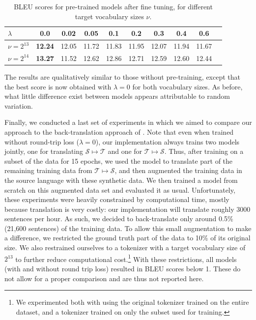 \documentclass[11pt,a4paper]{article}
\begin{document}
\begin{table} [ht]
\centering
\small
\begin{tabular}{ l || c | c | c | c | c | c | c | c | c  }
  $\lambda$ & 0.0 & 0.02 & 0.05 & 0.1 & 0.2 & 0.3 & 0.4 & 0.6 \\ \hline
  $\nu=2^{13}$ & \textbf{12.24} & 12.05 & 11.72 & 11.83 & 11.95 & 12.07 & 11.94 & 11.67 \\
  $\nu=2^{14}$ & \textbf{13.27} & 11.52 & 12.62 & 12.86 & 12.71 & 12.59 & 12.60 & 12.44 \\
\end{tabular}
\caption{BLEU scores for pre-trained models after fine tuning, for different target vocabulary sizes $\nu$.}
\label{tab:result2}
\end{table}

The results are qualitatively similar to those without pre-training, except that the best score is now obtained with $\lambda=0$ for both vocabulary sizes. As before, what little difference exist between models appears attributable to random variation.

Finally, we conducted a last set of experiments in which we aimed to compare our approach to the back-translation approach of \citet{backtrans}. Note that even when trained without round-trip loss ($\lambda=0$), our implementation always trains two models jointly, one for translating $\mathcal{S}\mapsto\mathcal{T}$ and one for $\mathcal{T}\mapsto\mathcal{S}$. Thus, after training on a subset of the data for 15 epochs, we used the model to translate part of the remaining training data from $\mathcal{T}\mapsto\mathcal{S}$, and then augmented the training data in the source language with these synthetic data. We then trained a model from scratch on this augmented data set and evaluated it as usual. Unfortunately, these experiments were heavily constrained by computational time, mostly because translation is very costly: our implementation will translate roughly 3000 sentences per hour. As such, we decided to back-translate only around 0.5\% (21,600 sentences) of the training data. To allow this small augmentation to make a difference, we restricted the ground truth part of the data to 10\% of its original size. We also restrained ourselves to a tokenizer with a target vocabulary size of  $2^{13}$ to further reduce computational cost.\footnote{We experimented both with using the original tokenizer trained on the entire dataset, and a tokenizer trained on only the subset used for training.} With these restrictions, all models (with and without round trip loss)  resulted in BLEU scores below 1. These do not allow for a proper comparison and are thus not reported here.
\end{document}
